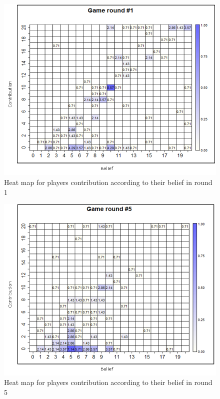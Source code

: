 \begin{figure}[!h]
	\centering
	\includegraphics[scale=0.35]{images/chapter3/HeatMapContribution1.png}
	\caption{Heat map for players contribution according to their belief in round 1}
	\label{fig:contribution1}
\end{figure}
\begin{figure}[!h]
	\centering
	\includegraphics[scale=0.35]{images/chapter3/HeatMapContribution5.png}
	\caption{Heat map for players contribution according to their belief in round 5}
	\label{fig:contribution2}
\end{figure}
